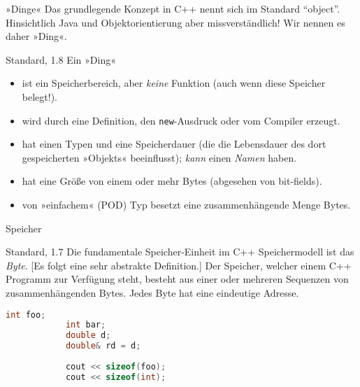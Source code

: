 \begin{frame}[fragile]{»Dinge«}
	Das grundlegende Konzept in C++ nennt sich im Standard \enquote{object}. Hinsichtlich Java und Objektorientierung aber missverständlich!
	Wir nennen es daher »Ding«.
	
	\pause
	
	\small
	\begin{block}{Standard, 1.8}
		Ein »Ding«
		\begin{itemize}
			\item ist ein Speicherbereich, aber \emph{keine} Funktion (auch wenn diese Speicher belegt!).
			\item wird durch eine Definition, den \verb|new|-Ausdruck oder vom Compiler erzeugt.
			\item hat einen Typen und eine Speicherdauer {\tiny (die die Lebensdauer des dort gespeicherten »Objekts« beeinflusst)}; \emph{kann} einen \emph{Namen} haben.
			\item hat eine Größe von einem oder mehr Bytes {\tiny (abgesehen von bit-fields)}.
			\item von »einfachem« {\tiny (POD)} Typ besetzt eine zusammenhängende Menge Bytes.
		\end{itemize}
	\end{block}
\end{frame}

\begin{frame}[fragile]{Speicher}
	\begin{block}{Standard, 1.7}
		Die fundamentale Speicher-Einheit im C++ Speichermodell ist das \emph{Byte}. [Es folgt eine sehr abstrakte Definition.]
		Der Speicher, welcher einem C++ Programm zur Verfügung steht, besteht aus einer oder mehreren Sequenzen von zusammenhängenden Bytes.
		Jedes Byte hat eine eindeutige Adresse.
	\end{block}
	
	\footnotesize
	\begin{block}{}
		\begin{lstlisting}[language=C++]
			int foo;
			int bar;
			double d;
			double& rd = d;
			
			cout << sizeof(foo);
			cout << sizeof(int);
		\end{lstlisting}
	\end{block}
\end{frame}

